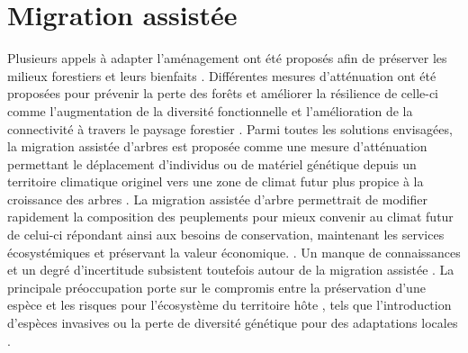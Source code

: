 \section*{Migration assistée}
\label{sec:fam}

Plusieurs appels à adapter l'aménagement ont été proposés afin de préserver les milieux forestiers et leurs bienfaits \citep{Nagel2017Adaptivesilviculture,Messier2021sakeresilience}.
Différentes mesures d'atténuation ont été proposées pour prévenir la perte des forêts et améliorer la résilience de celle-ci comme l'augmentation de la diversité fonctionnelle et l'amélioration de la connectivité à travers le paysage forestier \citep{Messier2019functionalcomplex}.
Parmi toutes les solutions envisagées, la migration assistée d'arbres est proposée comme une mesure d'atténuation permettant le déplacement d'individus ou de matériel génétique depuis un territoire climatique originel vers une zone de climat futur plus propice à la croissance des arbres \citep{Vitt2010Assistedmigration,Dumroese2015Considerationsrestoring,Park2018Informationunderload,Park2023Provenancetrials}. 
La migration assistée d'arbre permettrait de modifier rapidement la composition des peuplements pour mieux convenir au climat futur de celui-ci \citep{Pedlar2011implementationassisted} 
répondant ainsi aux besoins de conservation, maintenant les services écosystémiques et préservant la valeur économique. \citep{Ste-Marie2011Assistedmigration,Winder2011Ecologicalimplications}.
Un manque de connaissances et un degré d'incertitude subsistent toutefois autour de la migration assistée \citep{Klenk2015assistedmigration,Park2018Informationunderload}. 
La principale préoccupation porte sur le compromis entre la préservation d'une espèce et les risques pour l'écosystème du territoire hôte \citep{Ricciardi2009Assistedcolonization}, 
tels que l'introduction d'espèces invasives ou la perte de diversité génétique pour des adaptations locales \citep{McLachlan2007frameworkdebate,Vitt2010Assistedmigration,Hewitt2011Takingstock,VanDaele2022Genomicanalyses}.

